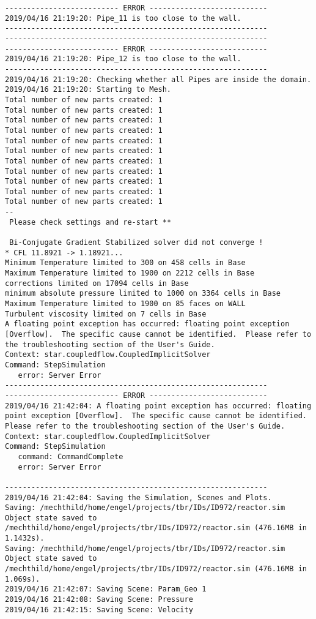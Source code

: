 \documentclass{article}
\begin{document}
{\begin{verbatim}
-------------------------- ERROR ---------------------------
2019/04/16 21:19:20: Pipe_11 is too close to the wall.
------------------------------------------------------------
------------------------------------------------------------
-------------------------- ERROR ---------------------------
2019/04/16 21:19:20: Pipe_12 is too close to the wall.
------------------------------------------------------------
2019/04/16 21:19:20: Checking whether all Pipes are inside the domain.
2019/04/16 21:19:20: Starting to Mesh.
Total number of new parts created: 1
Total number of new parts created: 1
Total number of new parts created: 1
Total number of new parts created: 1
Total number of new parts created: 1
Total number of new parts created: 1
Total number of new parts created: 1
Total number of new parts created: 1
Total number of new parts created: 1
Total number of new parts created: 1
Total number of new parts created: 1
--
 Please check settings and re-start ** 

 Bi-Conjugate Gradient Stabilized solver did not converge !
* CFL 11.8921 -> 1.18921...
Minimum Temperature limited to 300 on 458 cells in Base
Maximum Temperature limited to 1900 on 2212 cells in Base
corrections limited on 17094 cells in Base
minimum absolute pressure limited to 1000 on 3364 cells in Base
Maximum Temperature limited to 1900 on 85 faces on WALL
Turbulent viscosity limited on 7 cells in Base
A floating point exception has occurred: floating point exception [Overflow].  The specific cause cannot be identified.  Please refer to the troubleshooting section of the User's Guide.
Context: star.coupledflow.CoupledImplicitSolver
Command: StepSimulation
   error: Server Error
------------------------------------------------------------
-------------------------- ERROR ---------------------------
2019/04/16 21:42:04: A floating point exception has occurred: floating point exception [Overflow].  The specific cause cannot be identified.  Please refer to the troubleshooting section of the User's Guide.
Context: star.coupledflow.CoupledImplicitSolver
Command: StepSimulation
   command: CommandComplete
   error: Server Error

------------------------------------------------------------
2019/04/16 21:42:04: Saving the Simulation, Scenes and Plots.
Saving: /mechthild/home/engel/projects/tbr/IDs/ID972/reactor.sim
Object state saved to /mechthild/home/engel/projects/tbr/IDs/ID972/reactor.sim (476.16MB in 1.1432s).
Saving: /mechthild/home/engel/projects/tbr/IDs/ID972/reactor.sim
Object state saved to /mechthild/home/engel/projects/tbr/IDs/ID972/reactor.sim (476.16MB in 1.069s).
2019/04/16 21:42:07: Saving Scene: Param_Geo 1
2019/04/16 21:42:08: Saving Scene: Pressure
2019/04/16 21:42:15: Saving Scene: Velocity
\end{verbatim}
}
\clearpage
\end{document}
